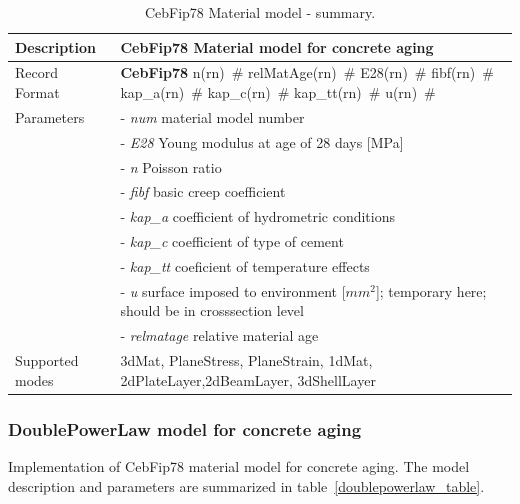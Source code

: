 \documentclass[epsf,a4paper]{article}
\newcommand{\descitem}[1]{{\noindent \bf #1}}
\newcommand{\elemparam}[2]{{{#1\tiny (#2)}~\#}}
\newcommand{\param}[1]{{\it #1}}
\begin{document}
\begin{table}[h]                                                                
\begin{tabular}{|l|p{9cm}|}                                                      
\hline                                                                          
Description & CebFip78 Material model  for concrete aging\\
\hline                                                                          
Record Format & \descitem{CebFip78}  \elemparam{n}{rn}
\elemparam{relMatAge}{rn} \elemparam{E28}{rn} \elemparam{fibf}{rn} \elemparam{kap\_a}{rn}
\elemparam{kap\_c}{rn} \elemparam{kap\_tt}{rn} \elemparam{u}{rn}\\ 
Parameters &- \param{num} material model number\\
&- \param{E28} Young modulus at age of 28 days [MPa]\\
&- \param{n} Poisson ratio\\
&- \param{fibf} basic creep coefficient\\
&- \param{kap\_a} coefficient of hydrometric conditions\\
&- \param{kap\_c} coefficient of type of cement\\
&- \param{kap\_tt} coeficient of temperature effects\\
&- \param{u} surface imposed to environment [$mm^2$]; temporary here; should be in crosssection level\\
&- \param{relmatage} relative material age \\
Supported modes& 3dMat, PlaneStress, PlaneStrain, 1dMat,
2dPlateLayer,2dBeamLayer, 3dShellLayer\\
\hline
\end{tabular}                                                                   
\caption{CebFip78 Material model - summary.}                
\label{cebfip_table}                                                         
\end{table}                                                                     

\subsubsection{DoublePowerLaw model for concrete aging}
Implementation of CebFip78 material model for concrete aging.
The model description and parameters are summarized
in table~\ref{doublepowerlaw_table}.
\end{document}

